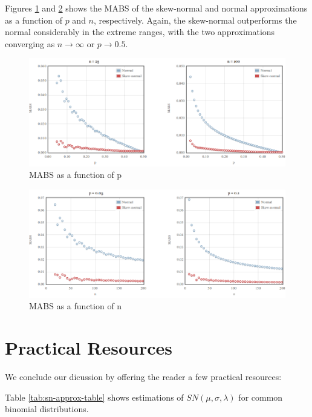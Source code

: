 \documentclass{article}
\begin{document}
Figures \ref{fig:mabs-fixed-n} and \ref{fig:mabs-fixed-p} shows the MABS of the
skew-normal and normal approximations as a function of $p$ and $n$,
respectively. Again, the skew-normal outperforms the normal considerably in the
extreme ranges, with the two approximations converging as $n \rightarrow
\infty$ or $p \rightarrow 0.5$.

\begin{figure}
  \centering
  \includegraphics[width=\textwidth]{../images/mabs-fixed-n.png}
  \caption{MABS as a function of p}
  \label{fig:mabs-fixed-n}
\end{figure}

\begin{figure}
  \centering
  \includegraphics[width=\textwidth]{../images/mabs-fixed-p.png}
  \caption{MABS as a function of n}
  \label{fig:mabs-fixed-p}
\end{figure}

\clearpage

\section{Practical Resources}
\label{sec:practical-resources}

We conclude our dicussion by offering the reader a few practical resources:

Table \ref{tab:sn-approx-table} shows estimations of $SN(\mu, \sigma, \lambda)$
for common binomial distributions.
\end{document}
